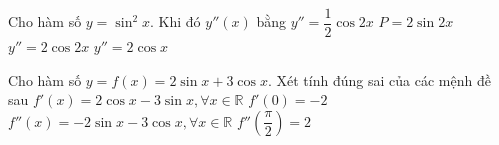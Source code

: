 \begin{ex}%
	Cho hàm số $y=\sin^2x$. Khi đó  $y''(x)$ bằng
	\choice 
		{$y''=\dfrac{1}{2}\cos 2x$} 
		{$P=2\sin  2x$}
		{\True  $y''=2\cos 2x$}
		{$y''=2\cos  x$}
\end{ex}

\begin{ex}%
 Cho hàm số $y=f(x)=2\sin x+3\cos x$. Xét tính đúng  sai của các mệnh đề sau
  \choiceTF
  {\True  $f'(x)=2\cos x-3\sin x, \forall x\in\mathbb{R}$}
  {$f'(0)=-2$} 
  {\True $f''(x)=-2\sin x-3\cos x,  \forall x\in\mathbb{R}$}
   {$f''\left(\dfrac{\pi}{2}\right)=2$}
\end{ex}

